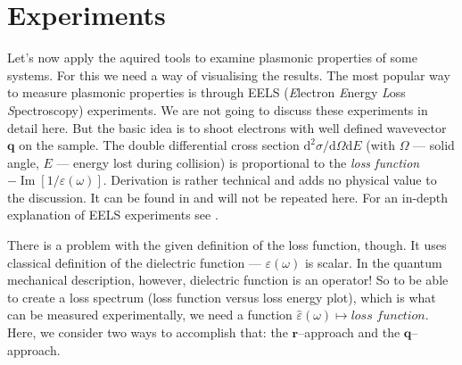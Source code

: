 \documentclass[a4paper,12pt]{article}
\begin{document}
\newpage
\section{Experiments}
    Let's now apply the aquired tools to examine plasmonic properties of some systems. For this we need a way of visualising the results. The most popular way to measure plasmonic properties is through EELS (\textit{E}lectron \textit{E}nergy \textit{L}oss \textit{S}pectroscopy) experiments. We are not going to discuss these experiments in detail here. But the basic idea is to shoot electrons with well defined wavevector $\mathbf{q}$ on the sample. The double differential cross section $\text{d}^2\sigma/\text{d}\Omega\text{d}E$ (with $\Omega$ --- solid angle, $E$ --- energy lost during collision) is proportional to the \textit{loss function} \ $-\operatorname{Im}[1 / \varepsilon(\omega)]$. Derivation is rather technical and adds no physical value to the discussion. It can be found in \cite{jackson1925classical} and will not be repeated here. For an in-depth explanation of EELS experiments see \cite{egerton2009eels}.

    There is a problem with the given definition of the loss function, though. It uses classical definition of the dielectric function --- $\varepsilon(\omega)$ is scalar. In the quantum mechanical description, however, dielectric function is an operator! So to be able to create a loss spectrum (loss function versus loss energy plot), which is what can be measured experimentally, we need a function $\hat\varepsilon(\omega) \mapsto \textit{loss function}$. Here, we consider two ways to accomplish that: the $\mathbf{r}$--approach and the $\mathbf{q}$--approach.
\end{document}
